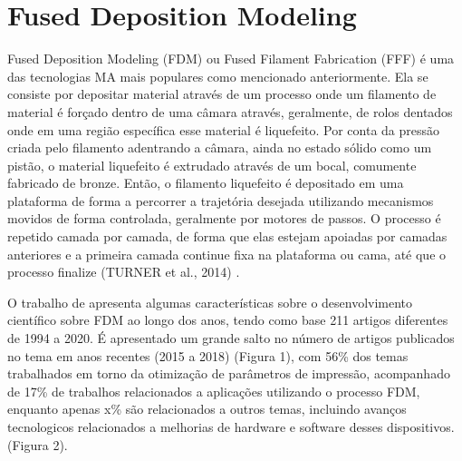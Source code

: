 

\section{Fused Deposition Modeling}
Fused Deposition Modeling (FDM) ou Fused Filament Fabrication 
(FFF) é uma das tecnologias MA mais populares como mencionado anteriormente.
Ela se consiste por depositar material através de um processo 
onde um filamento de material é forçado dentro de uma câmara através,
geralmente, de rolos dentados onde em uma região específica esse 
material é liquefeito. Por conta da pressão criada pelo filamento 
adentrando a câmara, ainda no estado sólido como um pistão, 
o material liquefeito é extrudado através de um bocal, 
comumente fabricado de bronze. Então, o filamento liquefeito é 
depositado em uma plataforma de forma a percorrer a trajetória 
desejada utilizando mecanismos movidos de forma controlada, 
geralmente por motores de passos. O processo é repetido camada 
por camada, de forma que elas estejam apoiadas por camadas 
anteriores e a primeira camada continue fixa na plataforma ou 
cama, até que o processo finalize (TURNER et al., 2014) \cite{turner14}.

O trabalho de \cite{vyavahare20} apresenta algumas 
características sobre o desenvolvimento científico sobre 
FDM ao longo dos anos, tendo como base 211 artigos diferentes 
de 1994 a 2020. É apresentado um grande salto no número de 
artigos publicados no tema em anos recentes (2015 a 2018) 
(Figura 1), com 56\% dos temas trabalhados em torno da 
otimização de parâmetros de impressão, acompanhado de 17\% de 
trabalhos relacionados a aplicações utilizando o processo FDM, enquanto apenas x\%
são relacionados a outros temas, incluindo avanços tecnologicos relacionados
a melhorias de hardware e software desses dispositivos.
(Figura 2).


